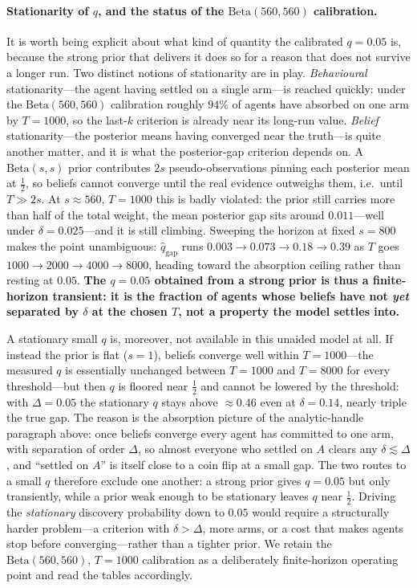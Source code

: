 \documentclass[12pt]{article}
\begin{document}
\paragraph{Stationarity of $q$, and the status of the $\mathrm{Beta}(560,560)$ calibration.}
\label{subsec:stationarity}
It is worth being explicit about what kind of quantity the calibrated $q = 0.05$ is, because the strong prior that delivers it does so for a reason that does not survive a longer run. Two distinct notions of stationarity are in play. \emph{Behavioural} stationarity---the agent having settled on a single arm---is reached quickly: under the $\mathrm{Beta}(560,560)$ calibration roughly $94\%$ of agents have absorbed on one arm by $T = 1000$, so the last-$k$ criterion is already near its long-run value. \emph{Belief} stationarity---the posterior means having converged near the truth---is quite another matter, and it is what the posterior-gap criterion depends on. A $\mathrm{Beta}(s,s)$ prior contributes $2s$ pseudo-observations pinning each posterior mean at $\tfrac12$, so beliefs cannot converge until the real evidence outweighs them, i.e.\ until $T \gg 2s$. At $s \approx 560$, $T = 1000$ this is badly violated: the prior still carries more than half of the total weight, the mean posterior gap sits around $0.011$---well under $\delta = 0.025$---and it is still climbing. Sweeping the horizon at fixed $s = 800$ makes the point unambiguous: $\hat q_{\text{gap}}$ runs $0.003 \to 0.073 \to 0.18 \to 0.39$ as $T$ goes $1000 \to 2000 \to 4000 \to 8000$, heading toward the absorption ceiling rather than resting at $0.05$. \textbf{The $q = 0.05$ obtained from a strong prior is thus a finite-horizon transient: it is the fraction of agents whose beliefs have not \emph{yet} separated by $\delta$ at the chosen $T$, not a property the model settles into.}

A stationary small $q$ is, moreover, not available in this unaided model at all. If instead the prior is flat ($s = 1$), beliefs converge well within $T = 1000$---the measured $q$ is essentially unchanged between $T = 1000$ and $T = 8000$ for every threshold---but then $q$ is floored near $\tfrac12$ and cannot be lowered by the threshold: with $\Delta = 0.05$ the stationary $q$ stays above $\approx 0.46$ even at $\delta = 0.14$, nearly triple the true gap. The reason is the absorption picture of the analytic-handle paragraph above: once beliefs converge every agent has committed to one arm, with separation of order $\Delta$, so almost everyone who settled on $A$ clears any $\delta \lesssim \Delta$, and ``settled on $A$'' is itself close to a coin flip at a small gap. The two routes to a small $q$ therefore exclude one another: a strong prior gives $q = 0.05$ but only transiently, while a prior weak enough to be stationary leaves $q$ near $\tfrac12$. Driving the \emph{stationary} discovery probability down to $0.05$ would require a structurally harder problem---a criterion with $\delta > \Delta$, more arms, or a cost that makes agents stop before converging---rather than a tighter prior. We retain the $\mathrm{Beta}(560,560)$, $T = 1000$ calibration as a deliberately finite-horizon operating point and read the tables accordingly.
\end{document}
